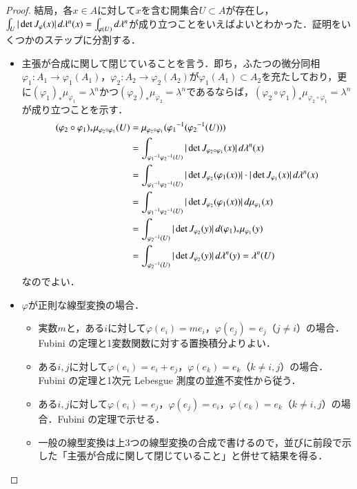 \begin{proof}
結局，各$x \in A$に対して$x$を含む開集合$U \subset A$が存在し，$\int_U |\det J_\varphi(x)| \mathop{}\!d \lambda^n(x) = \int_{\varphi(U)} \mathop{}\!d \lambda^n$が成り立つことをいえばよいとわかった．証明をいくつかのステップに分割する．
\begin{itemize}
\item 主張が合成に関して閉じていることを言う．即ち，ふたつの微分同相$\varphi_1 \colon A_1 \to \varphi_1(A_1)$，$\varphi_2\colon A_2 \to \varphi_2(A_2)$が$\varphi_1(A_1) \subset A_2$を充たしており，更に$(\varphi_1)_* \mu_{\varphi_1} = \lambda^n$かつ$(\varphi_2)_* \mu_{\varphi_2} = \lambda^n$であるならば，$(\varphi_2 \circ \varphi_1)_* \mu_{\varphi_2 \circ \varphi_1} = \lambda^n$が成り立つことを示す．
\begin{align}
(\varphi_2 \circ \varphi_1)_* \mu_{\varphi_2 \circ \varphi_1} (U) &= \mu_{\varphi_2 \circ \varphi_1} ({\varphi_1}^{-1} ({\varphi_2}^{-1}(U))) \\
&= \int_{{\varphi_1}^{-1}{\varphi_2}^{-1}(U)} |\det J_{\varphi_2 \circ \varphi_1} (x)| \mathop{}\!d \lambda^n(x)\\
&= \int_{{\varphi_1}^{-1}{\varphi_2}^{-1}(U)} |\det J_{\varphi_2} ( \varphi_1 (x))| \cdot |\det J_{\varphi_1}(x)| \mathop{}\!d \lambda^n(x)\\
&=\int_{{\varphi_1}^{-1}{\varphi_2}^{-1}(U)} |\det J_{\varphi_2} ( \varphi_1 (x))| \mathop{}\!d \mu_{\varphi_1}(x)\\
&=\int_{{\varphi_2}^{-1}(U)} |\det J_{\varphi_2} (y)| \mathop{}\!d (\varphi_1)_*\mu_{\varphi_1}(y)\\
&=\int_{{\varphi_2}^{-1}(U)} |\det J_{\varphi_2} (y)| \mathop{}\!d \lambda^n(y) = \lambda^n(U)
\end{align}なのでよい．
\item $\varphi$が正則な線型変換の場合．
\begin{itemize}
\item 実数$m$と，ある$i$に対して$\varphi(e_i) = me_i$，$\varphi(e_j) = e_j$（$j \neq i$）の場合．Fubini の定理と1変数関数に対する置換積分よりよい．
\item ある$i,j$に対して$\varphi(e_i) = e_i + e_j$，$\varphi(e_k) = e_k$（$k \neq i,j$）の場合．Fubini の定理と1次元 Lebesgue 測度の並進不変性から従う．
\item ある$i,j$に対して$\varphi(e_i) = e_j$，$\varphi(e_j) = e_i$，$\varphi(e_k) = e_k$（$k \neq i,j$）の場合．Fubini の定理で示せる．
\item 一般の線型変換は上3つの線型変換の合成で書けるので，並びに前段で示した「主張が合成に関して閉じていること」と併せて結果を得る．
\end{itemize}

\end{itemize}
\end{proof}
